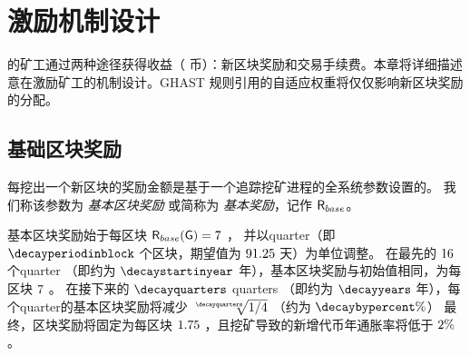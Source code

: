 
\section{激励机制设计}
\label{sec:incentive}

{\name} 的矿工通过两种途径获得收益（ {\name} 币）：新区块奖励和交易手续费。本章将详细描述 {\name} 意在激励矿工的机制设计。GHAST 规则引用的自适应权重将仅仅影响新区块奖励的分配。




\subsection{基础区块奖励}
\label{subsec:baseaward}
每挖出一个新区块的奖励金额是基于一个追踪挖矿进程的全系统参数设置的。
我们称该参数为 \emph{基本区块奖励} 或简称为 \emph{基本奖励}，记作 $\textsf{R}_{base}$。


基本区块奖励始于每区块 $\textsf{R}_{base}(\textsf{G}) = 7$ \coinsign，
并以quarter（即 $\decayperiodinblock$ 个区块，期望值为 $91.25$ 天）为单位调整。
在最先的 $16$	个quarter （即约为 $\decaystartinyear$ 年），基本区块奖励与初始值相同，为每区块 $7$ \coinsign。 
在接下来的 $\decayquarters$ quarters （即约为 $\decayyears$ 年），每个quarter的基本区块奖励将减少 $\sqrt[\decayquarters]{1/4}$ （约为 $\decaybypercent\%$）
最终，区块奖励将固定为每区块 $1.75$ \coinsign，且挖矿导致的新增代币年通胀率将低于 $2\%$。

